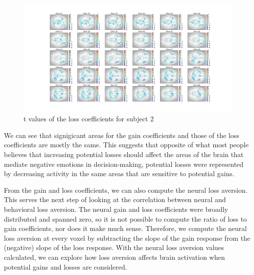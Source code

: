 \begin{figure}[H]
    \centering
        \includegraphics[scale=0.3]{figures/t_loss_standard_sub2.png}
    \caption{t values of the loss coefficients for subject 2}
\end{figure}

We can see that signigicant areas for the gain coefficients and those of the 
loss coefficients are mostly the same. This suggests that opposite of what 
most people believes that increasing potential losses should affect the areas 
of the brain that mediate negative emotions in decision-making, potential 
losses were represented by decreasing activity in the same areas that are 
sensitive to potential gains.

From the gain and loss coefficients, we can also compute the neural loss
aversion. This serves the next step of looking at the correlation between
neural and behavioral loss aversion. The neural gain and loss coefficients
were broadly distributed and spanned zero, so it is not possible to compute
the ratio of loss to gain coefficients, nor does it make much sense.
Therefore, we compute the neural loss aversion at every voxel by subtracting
the slope of the gain response from the (negative) slope of the loss response.
With the neural loss aversion values calculated, we can explore how loss
aversion affects brain activation when potential gains and losses are
considered.


